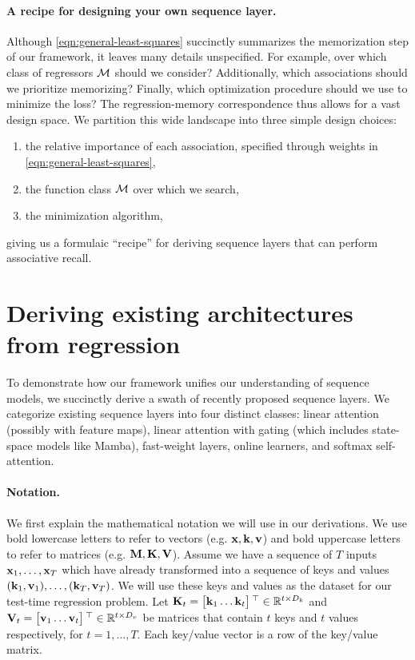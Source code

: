 \documentclass[notitlepage, 11pt]{article}
\newcommand*{\dkey}{{D_k}}
\newcommand*{\dval}{{D_v}}
\begin{document}
\paragraph{A recipe for designing your own sequence layer.}
Although \autoref{eqn:general-least-squares} succinctly summarizes the memorization step of our framework, it leaves many details unspecified.
For example, over which class of regressors $\mathcal{M}$ should we consider?
Additionally, which associations should we prioritize memorizing?
Finally, which optimization procedure should we use to minimize the loss?
The regression-memory correspondence thus allows for a vast design space.
We partition this wide landscape into three simple design choices:
\begin{enumerate}
    \item the relative importance of each association, specified through weights in  \autoref{eqn:general-least-squares},
    \item the function class $\mathcal{M}$ over which we search,
    \item the minimization algorithm,
\end{enumerate}
giving us a formulaic ``recipe'' for deriving sequence layers that can perform associative recall.




\section{Deriving existing architectures from regression}\label{sec:deriving-architectures}

To demonstrate how our framework unifies our understanding of sequence models, we succinctly derive a swath of recently proposed sequence layers.
We categorize existing sequence layers into four distinct classes: linear attention (possibly with feature maps), linear attention with gating (which includes state-space models like Mamba), fast-weight layers, online learners, and softmax self-attention.










\paragraph{Notation.}
We first explain the mathematical notation we will use in our derivations.
We use bold lowercase letters to refer to vectors (e.g. $\mathbf{x}, \mathbf{k}, \mathbf{v}$) and bold uppercase letters to refer to matrices (e.g. $\mathbf{M}, \mathbf{K}, \mathbf{V}$).
Assume we have a sequence of $T$ inputs $\mathbf{x}_1, \ldots, \mathbf{x}_T$ which have already transformed into a sequence of keys and values $(\mathbf{k}_1, \mathbf{v}_1), \ldots, (\mathbf{k}_T, \mathbf{v}_T)$.
We will use these keys and values as the dataset for our test-time regression problem.
Let $\Kbf_t = \bmat{\kbf_1 \ldots \kbf_t}\transpose \in \reals^{t\times \dkey}$ and $\Vbf_t = \bmat{\vbf_1 \ldots \vbf_t}\transpose \in \reals^{t\times \dval}$ be matrices that contain $t$ keys and $t$ values respectively, for $t=1, \ldots, T$.
Each key/value vector is a row of the key/value matrix.
\end{document}
